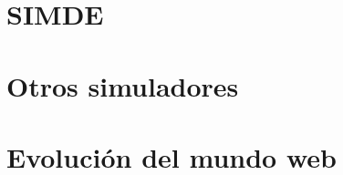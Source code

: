 

\section{SIMDE}
\label{2:sec1}


\section{Otros simuladores}
\label{2:sec2}


\section{Evolución del mundo web}
\label{2:sec3}



